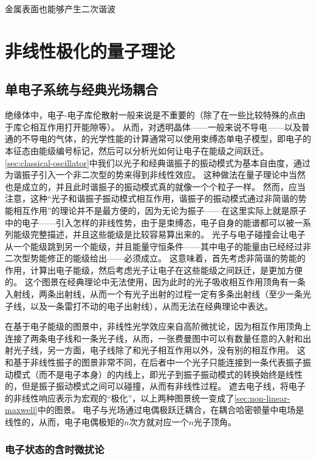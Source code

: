金属表面也能够产生二次谐波

\section{非线性极化的量子理论}

\subsection{单电子系统与经典光场耦合}

绝缘体中，电子-电子库伦散射一般来说是不重要的（除了在一些比较特殊的点由于库仑相互作用打开能隙等）。
从而，对透明晶体——一般来说不导电——以及普通的不导电的气体，的光学性能的计算通常可以使用束缚态单电子模型，即电子的本征态由能级编号标记，然后可以分析光如何让电子在能级之间跃迁。
\autoref{sec:classical-oscillator}中我们以光子和经典谐振子的振动模式为基本自由度，通过为谐振子引入一个非二次型的势来得到非线性效应。
这种做法在量子理论中当然也是成立的，并且此时谐振子的振动模式真的就像一个个粒子一样。
然而，应当注意，这种“光子和谐振子振动模式相互作用，谐振子的振动模式通过非简谐的势能相互作用”的理论并不是最方便的，因为无论为振子——在这里实际上就是原子中的电子——引入怎样的非线性势，由于是束缚态，电子自身的能谱都可以被一系列能级完整描述，并且这些能级是比较容易算出来的。
光子与电子碰撞会让电子从一个能级跳到另一个能级，并且能量守恒条件——其中电子的能量由已经经过非二次型势能修正的能级给出——必须成立。
这意味着，首先考虑非简谐的势能的作用，计算出电子能级，然后考虑光子让电子在这些能级之间跃迁，是更加方便的。
这个图景在经典理论中无法使用，因为此时的光子吸收相互作用顶角有一条入射线，两条出射线，从而一个有光子出射的过程一定有多条出射线（至少一条光子线，以及一条雷打不动的电子出射线），从而无法在经典理论中表达。

在基于电子能级的图景中，非线性光学效应来自高阶微扰论，因为相互作用顶角上连接了两条电子线和一条光子线，从而，一张费曼图中可以有数量任意的入射和出射光子线，另一方面，电子线除了和光子相互作用以外，没有别的相互作用。
这和基于非线性振子的图景非常不同，在后者中一个光子只能连接到一条代表振子振动模式（而不是电子本身）的内线上，即光子到振子振动模式的转换始终是线性的，但是振子振动模式之间可以碰撞，从而有非线性过程。
遮去电子线，将电子的非线性响应表示为宏观的“极化”，以上两种图景统一变成了\autoref{sec:non-linear-maxwell}中的图景。
电子与光场通过电偶极跃迁耦合，在耦合哈密顿量中电场是线性的，从而，电子电偶极矩的$n$次方就对应一个$n$光子顶角。

\subsubsection{电子状态的含时微扰论}

